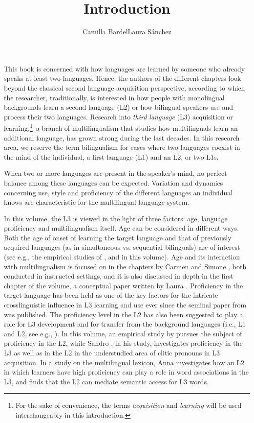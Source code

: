 \documentclass[output=paper,colorlinks,citecolor=brown,nonflat]{langsci/langscibook}
\author{Camilla Bardel\affiliation{Stockholm University}\lastand Laura Sánchez\affiliation{Stockholm University}}
\title{Introduction}
\begin{document}
\maketitle

This book is concerned with how languages are learned by someone who already speaks at least two languages. Hence, the authors of the different chapters look beyond the classical second language acquisition perspective, according to which the researcher, traditionally, is interested in how people with monolingual backgrounds learn a second language (L2) or how bilingual speakers use and process their two languages. Research into \textit{third language} (L3) acquisition or learning,\footnote{For the sake of convenience, the terms \textit{acquisition} and \textit{learning} will be used interchangeably in this introduction.}~a branch of multilingualism that studies how multilinguals learn an additional language, has grown strong during the last decades. In this research area, we reserve the term bilingualism for cases where two languages coexist in the mind of the individual, a first language (L1) and an L2, or two L1s. 

When two or more languages are present in the speaker’s mind, no perfect balance among these languages can be expected. Variation and dynamics concerning use, style and proficiency of the different languages an individual knows are characteristic for the multilingual language system.

In this volume, the L3 is viewed in the light of three factors: age, language proficiency and multilingualism itself. Age can be considered in different ways. Both the age of onset of learning the target language and that of previously acquired languages (as in simultaneous vs. sequential bilinguals) are of interest (see e.g., the empirical studies of \citeauthor{chapters/munoz}, \citeauthor{chapters/pfenninger} and \citeauthor{chapters/sanchez7} in this volume). Age and its interaction with multilingualism is focused on in the chapters by Carmen \citeauthor{chapters/munoz} and Simone \citeauthor{chapters/pfenninger}, both conducted in instructed settings, and it is also discussed in depth in the first chapter of the volume, a conceptual paper written by Laura \citeauthor{chapters/sanchez1}. Proficiency in the target language has been held as one of the key factors for the intricate crosslinguistic influence in L3 learning and use ever since the seminal paper from \citet{WilliamsHammarberg1998} was published. The proficiency level in the L2 has also been suggested to play a role for L3 development and for transfer from the background languages (i.e., L1 and L2, see e.g., \citealt{BardelLindqvist2007, SánchezBardel2017Transfer}). In this volume, an empirical study by \citeauthor{chapters/sanchez7} pursues the subject of proficiency in the L2, while Sandro \citeauthor{chapters/sciutti}, in his study, investigates proficiency in the L3 as well as in the L2 in the understudied area of clitic pronouns in L3 acquisition. In a study on the multilingual lexicon, Anna \citeauthor{chapters/gudmundson} investigates how an L2 in which learners have high proficiency can play a role in word associations in the L3, and finds that the L2 can mediate semantic access for L3 words.
\end{document}
